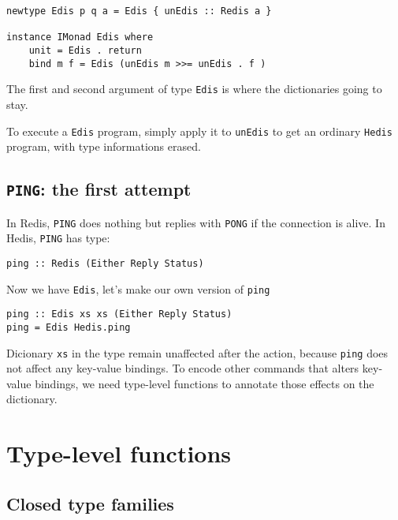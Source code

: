 \documentclass[pldi]{sigplanconf-pldi16}
\begin{document}
\begin{verbatim}
newtype Edis p q a = Edis { unEdis :: Redis a }

instance IMonad Edis where
    unit = Edis . return
    bind m f = Edis (unEdis m >>= unEdis . f )
\end{verbatim}

The first and second argument of type \texttt{Edis} is where the
dictionaries going to stay.

To execute a \texttt{Edis} program, simply apply it to
 \texttt{unEdis} to get an ordinary
 \texttt{Hedis} program, with type informations erased.

\subsection{\texttt{PING}: the first attempt}

In Redis, \texttt{PING} does nothing but replies with
\texttt{PONG} if the connection is alive. In Hedis,
\texttt{PING} has type:

\begin{verbatim}
ping :: Redis (Either Reply Status)
\end{verbatim}

Now we have \texttt{Edis}, let's make our own version of
\texttt{ping}\footnotemark


\begin{verbatim}
ping :: Edis xs xs (Either Reply Status)
ping = Edis Hedis.ping
\end{verbatim}

Dicionary \texttt{xs} in the type remain unaffected after the
action, because \texttt{ping} does not affect any key-value
bindings. To encode other commands that alters key-value bindings, we need
 type-level functions to annotate those effects on the dictionary.

\section{Type-level functions}
\subsection{Closed type families}
\end{document}
